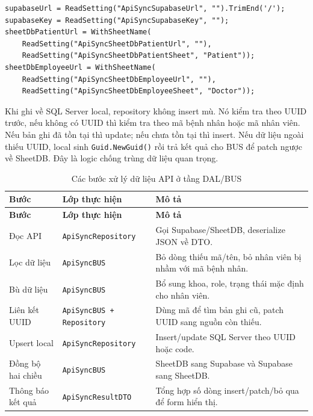 \documentclass[12pt,a4paper]{article}
\numberwithin{figure}{subsection}
\numberwithin{table}{subsection}
\newcounter{codecounter}
\newenvironment{codeblock}[2]{%
    \refstepcounter{codecounter}%
    \phantomsection%
    \label{#1}%
    \par\smallskip
}{%
    \par\smallskip
}
\begin{document}
\begin{codeblock}{code:api-repository-config}{Đọc cấu hình API trong ApiSyncRepository}
\begin{verbatim}
supabaseUrl = ReadSetting("ApiSyncSupabaseUrl", "").TrimEnd('/');
supabaseKey = ReadSetting("ApiSyncSupabaseKey", "");
sheetDbPatientUrl = WithSheetName(
    ReadSetting("ApiSyncSheetDbPatientUrl", ""),
    ReadSetting("ApiSyncSheetDbPatientSheet", "Patient"));
sheetDbEmployeeUrl = WithSheetName(
    ReadSetting("ApiSyncSheetDbEmployeeUrl", ""),
    ReadSetting("ApiSyncSheetDbEmployeeSheet", "Doctor"));
\end{verbatim}
\end{codeblock}

Khi ghi về SQL Server local, repository không insert mù. Nó kiểm tra theo UUID trước, nếu không có UUID thì kiểm tra theo mã bệnh nhân hoặc mã nhân viên. Nếu bản ghi đã tồn tại thì update; nếu chưa tồn tại thì insert. Nếu dữ liệu ngoài thiếu UUID, local sinh \texttt{Guid.NewGuid()} rồi trả kết quả cho BUS để patch ngược về SheetDB. Đây là logic chống trùng dữ liệu quan trọng.

\begin{longtable}{|p{3.4cm}|p{4.8cm}|p{5.6cm}|}
\caption{Các bước xử lý dữ liệu API ở tầng DAL/BUS} \\
\hline
\textbf{Bước} & \textbf{Lớp thực hiện} & \textbf{Mô tả} \\
\hline
\endfirsthead
\hline
\textbf{Bước} & \textbf{Lớp thực hiện} & \textbf{Mô tả} \\
\hline
\endhead
Đọc API & \texttt{ApiSyncRepository} & Gọi Supabase/SheetDB, deserialize JSON về DTO. \\
\hline
Lọc dữ liệu & \texttt{ApiSyncBUS} & Bỏ dòng thiếu mã/tên, bỏ nhân viên bị nhầm với mã bệnh nhân. \\
\hline
Bù dữ liệu & \texttt{ApiSyncBUS} & Bổ sung khoa, role, trạng thái mặc định cho nhân viên. \\
\hline
Liên kết UUID & \texttt{ApiSyncBUS + Repository} & Dùng mã để tìm bản ghi cũ, patch UUID sang nguồn còn thiếu. \\
\hline
Upsert local & \texttt{ApiSyncRepository} & Insert/update SQL Server theo UUID hoặc code. \\
\hline
Đồng bộ hai chiều & \texttt{ApiSyncBUS} & SheetDB sang Supabase và Supabase sang SheetDB. \\
\hline
Thông báo kết quả & \texttt{ApiSyncResultDTO} & Tổng hợp số dòng insert/patch/bỏ qua để form hiển thị. \\
\hline
\end{longtable}
\end{document}
